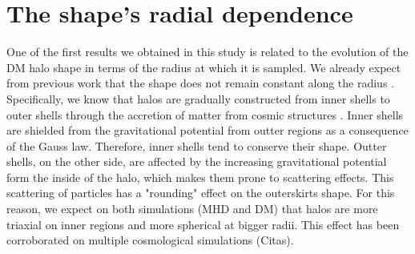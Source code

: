 \section{The shape's radial dependence}
One of the first results we obtained in this study is related to the evolution of the DM halo shape in terms of the radius at which it is sampled. We already expect from previous work that the shape does not remain constant along the radius \cite{Vera-Ciro et al 2011}. Specifically, we know that halos are gradually constructed from inner shells to outer shells through the accretion of matter from cosmic structures \cite{}. Inner shells are shielded from the gravitational potential from outter regions as a consequence of the Gauss law. Therefore, inner shells tend to conserve their shape. Outter shells, on the other side, are affected by the increasing gravitational potential form the inside of the halo, which makes them prone to scattering effects. This scattering of particles has a "rounding" effect on the outerskirts shape. For this reason, we expect on both simulations (MHD and DM) that halos are more triaxial on inner regions and more spherical at bigger radii. This effect has been corroborated on multiple cosmological simulations (Citas)\cite{}. \\


